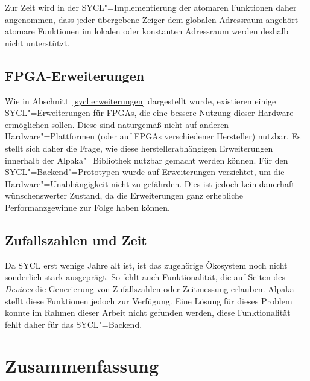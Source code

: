 Zur Zeit wird in der SYCL"=Implementierung der atomaren Funktionen daher
angenommen, dass jeder übergebene Zeiger dem globalen Adressraum angehört --
atomare Funktionen im lokalen oder konstanten Adressraum werden deshalb nicht
unterstützt.

\subsection{FPGA-Erweiterungen}\label{implementierung:probleme:fpga}

Wie in Abschnitt~\ref{sycl:erweiterungen} dargestellt wurde, existieren einige
SYCL"=Erweiterungen für FPGAs, die eine bessere Nutzung dieser Hardware
ermöglichen sollen. Diese sind naturgemäß nicht auf anderen
Hardware"=Plattformen (oder auf FPGAs verschiedener Hersteller) nutzbar. Es
stellt sich daher die Frage, wie diese herstellerabhängigen Erweiterungen
innerhalb der Alpaka"=Bibliothek nutzbar gemacht werden können. Für den
SYCL"=Backend"=Prototypen wurde auf Erweiterungen verzichtet, um die
Hardware"=Unabhängigkeit nicht zu gefährden. Dies ist jedoch kein dauerhaft
wünschenswerter Zustand, da die Erweiterungen ganz erhebliche Performanzgewinne
zur Folge haben können.

\subsection{Zufallszahlen und Zeit}

Da SYCL erst wenige Jahre alt ist, ist das zugehörige Ökosystem noch nicht
sonderlich stark ausgeprägt. So fehlt auch Funktionalität, die auf Seiten des
\textit{Devices} die Generierung von Zufallszahlen oder Zeitmessung erlauben.
Alpaka stellt diese Funktionen jedoch zur Verfügung. Eine Lösung für dieses
Problem konnte im Rahmen dieser Arbeit nicht gefunden werden, diese
Funktionalität fehlt daher für das SYCL"=Backend.

\section{Zusammenfassung}


